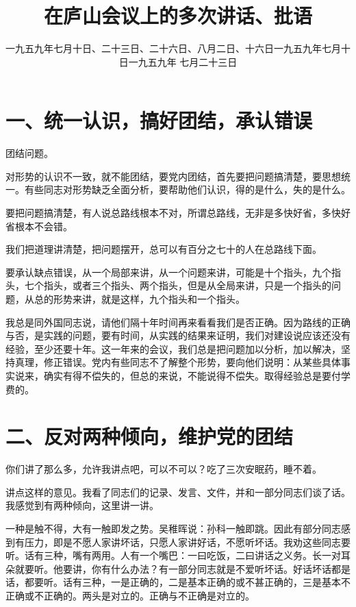 
\title{在庐山会议上的多次讲话、批语}
\date{一九五九年七月十日、二十三日、二十六日、八月二日、十六日}
\maketitle


\date{一九五九年七月十日}
\section{一、统一认识，搞好团结，承认错误}

团结问题。

对形势的认识不一致，就不能团结，要党内团结，首先要把问题搞清楚，要思想统一。有些同志对形势缺乏全面分析，要帮助他们认识，得的是什么，失的是什么。

要把问题搞清楚，有人说总路线根本不对，所谓总路线，无非是多快好省，多快好省根本不会错。

我们把道理讲清楚，把问题摆开，总可以有百分之七十的人在总路线下面。

要承认缺点错误，从一个局部来讲，从一个问题来讲，可能是十个指头，九个指头，七个指头，或者三个指头、两个指头，但是从全局来讲，只是一个指头的问题，从总的形势来讲，就是这样，九个指头和一个指头。

我总是同外国同志说，请他们隔十年时间再来看看我们是否正确。因为路线的正确与否，是实践的问题，要有时间，从实践的结果来证明，我们对建设说应该还没有经验，至少还要十年。这一年来的会议，我们总是把问题加以分析，加以解决，坚持真理，修正错误。党内有些同志不了解整个形势，要向他们说明：从某些具体事实说来，确实有得不偿失的，但总的来说，不能说得不偿失。取得经验总是要付学费的。

\date{一九五九年 七月二十三日}
\section{二、反对两种倾向，维护党的团结}

你们讲了那么多，允许我讲点吧，可以不可以？吃了三次安眠药，睡不着。

讲点这样的意见。我看了同志们的记录、发言、文件，并和一部分同志们谈了话。我感觉到有两种倾向，这里讲一讲。

一种是触不得，大有一触即发之势。吴稚晖说：孙科一触即跳。因此有部分同志感到有压力，即是不愿人家讲坏话，只愿人家讲好话，不愿听坏话。我劝这些同志要听。话有三种，嘴有两用。人有一个嘴巴：一曰吃饭，二曰讲话之义务。长一对耳朵就要听。他要讲，你有什么办法？有一部分同志就是不爱听坏话。好话坏话都是话，都要听。话有三种，一是正确的，二是基本正确的或不甚正确的，三是基本不正确或不正确的。两头是对立的。正确与不正确是对立的。

